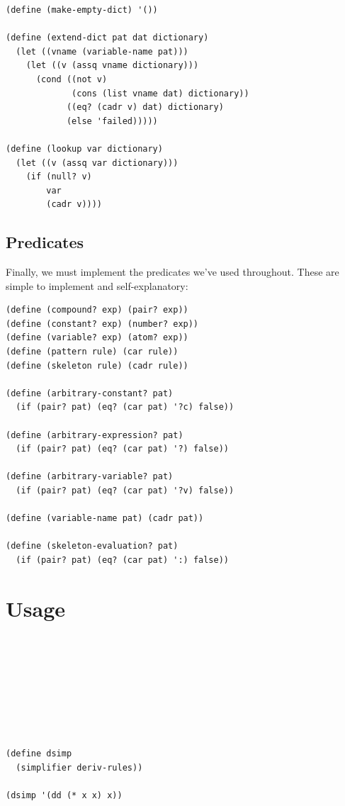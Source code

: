 \documentclass[9pt]{report}
\begin{document}
\begin{verbatim}
(define (make-empty-dict) '())

(define (extend-dict pat dat dictionary)
  (let ((vname (variable-name pat)))
    (let ((v (assq vname dictionary)))
      (cond ((not v)
             (cons (list vname dat) dictionary))
            ((eq? (cadr v) dat) dictionary)
            (else 'failed)))))

(define (lookup var dictionary)
  (let ((v (assq var dictionary)))
    (if (null? v)
        var
        (cadr v))))
\end{verbatim}

\subsection{Predicates}
\label{sec:orgf93afe9}
Finally, we must implement the predicates we've used throughout.
These are simple to implement and self-explanatory:

\begin{verbatim}
(define (compound? exp) (pair? exp))
(define (constant? exp) (number? exp))
(define (variable? exp) (atom? exp))
(define (pattern rule) (car rule))
(define (skeleton rule) (cadr rule))

(define (arbitrary-constant? pat)
  (if (pair? pat) (eq? (car pat) '?c) false))

(define (arbitrary-expression? pat)
  (if (pair? pat) (eq? (car pat) '?) false))

(define (arbitrary-variable? pat)
  (if (pair? pat) (eq? (car pat) '?v) false))

(define (variable-name pat) (cadr pat))

(define (skeleton-evaluation? pat)
  (if (pair? pat) (eq? (car pat) ':) false))
\end{verbatim}

\section{Usage}
\label{sec:org57d34b8}

\begin{verbatim}








(define dsimp
  (simplifier deriv-rules))

(dsimp '(dd (* x x) x))
\end{verbatim}
\end{document}
